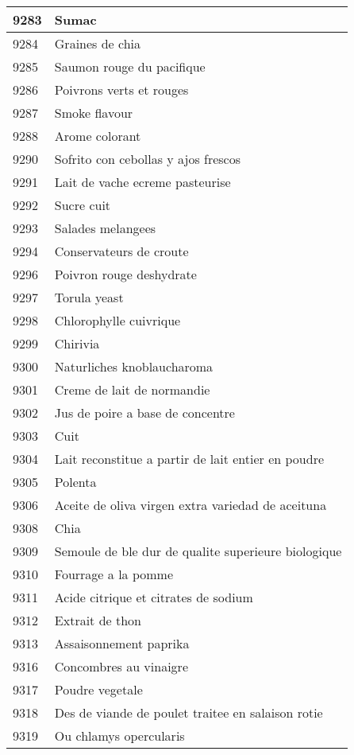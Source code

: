 \begin{longtable}{|l|l|}
9283 & Sumac \\ \hline 
9284 & Graines de chia \\ \hline 
9285 & Saumon rouge du pacifique \\ \hline 
9286 & Poivrons verts et rouges \\ \hline 
9287 & Smoke flavour \\ \hline 
9288 & Arome colorant \\ \hline 
9290 & Sofrito con cebollas y ajos frescos \\ \hline 
9291 & Lait de vache ecreme pasteurise \\ \hline 
9292 & Sucre cuit \\ \hline 
9293 & Salades melangees \\ \hline 
9294 & Conservateurs de croute \\ \hline 
9296 & Poivron rouge deshydrate \\ \hline 
9297 & Torula yeast \\ \hline 
9298 & Chlorophylle cuivrique \\ \hline 
9299 & Chirivia \\ \hline 
9300 & Naturliches knoblaucharoma \\ \hline 
9301 & Creme de lait de normandie \\ \hline 
9302 & Jus de poire a base de concentre \\ \hline 
9303 & Cuit \\ \hline 
9304 & Lait reconstitue a partir de lait entier en poudre \\ \hline 
9305 & Polenta \\ \hline 
9306 & Aceite de oliva virgen extra variedad de aceituna \\ \hline 
9308 & Chia \\ \hline 
9309 & Semoule de ble dur de qualite superieure biologique \\ \hline 
9310 & Fourrage a la pomme \\ \hline 
9311 & Acide citrique et citrates de sodium \\ \hline 
9312 & Extrait de thon \\ \hline 
9313 & Assaisonnement paprika \\ \hline 
9316 & Concombres au vinaigre \\ \hline 
9317 & Poudre vegetale \\ \hline 
9318 & Des de viande de poulet traitee en salaison rotie \\ \hline 
9319 & Ou chlamys opercularis \\ \hline 

\end{longtable}
